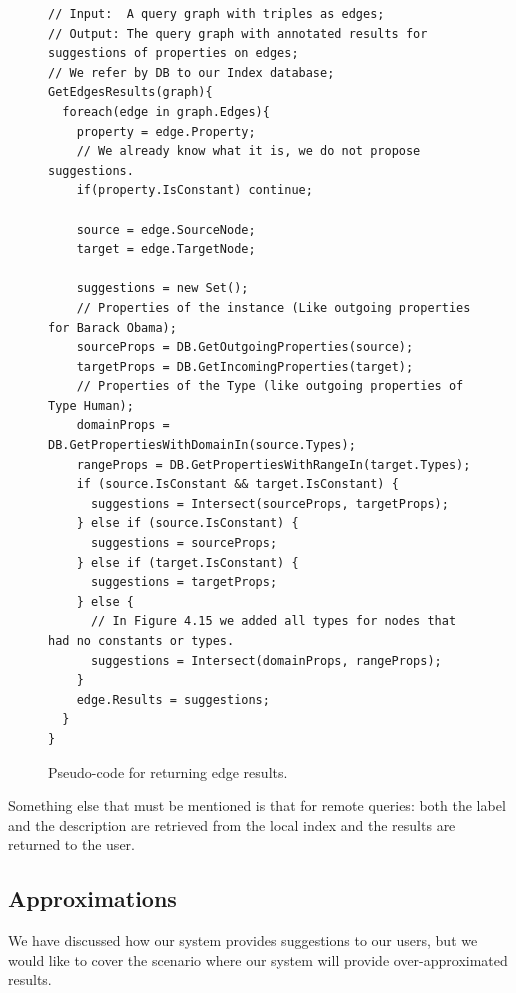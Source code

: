 \begin{example}
\begin{figure}[h]
\begin{verbatim}
// Input:  A query graph with triples as edges;
// Output: The query graph with annotated results for suggestions of properties on edges;
// We refer by DB to our Index database;
GetEdgesResults(graph){
  foreach(edge in graph.Edges){
    property = edge.Property;
    // We already know what it is, we do not propose suggestions.
    if(property.IsConstant) continue;
    
    source = edge.SourceNode;
    target = edge.TargetNode;

    suggestions = new Set();
    // Properties of the instance (Like outgoing properties for Barack Obama);
    sourceProps = DB.GetOutgoingProperties(source);
    targetProps = DB.GetIncomingProperties(target);
    // Properties of the Type (like outgoing properties of Type Human);
    domainProps = DB.GetPropertiesWithDomainIn(source.Types);
    rangeProps = DB.GetPropertiesWithRangeIn(target.Types);
    if (source.IsConstant && target.IsConstant) {
      suggestions = Intersect(sourceProps, targetProps);
    } else if (source.IsConstant) {
      suggestions = sourceProps;
    } else if (target.IsConstant) {
      suggestions = targetProps;
    } else {
      // In Figure 4.15 we added all types for nodes that had no constants or types.
      suggestions = Intersect(domainProps, rangeProps);
    }
    edge.Results = suggestions;
  }
}
\end{verbatim}
\caption{Pseudo-code for returning edge results.}
\label{fig:codeResultsEdges}
\end{figure}

\end{example}

Something else that must be mentioned is that for remote queries: both the label and the description are retrieved from the local index and the results are returned to the user. 


\subsection{Approximations}

We have discussed how our system provides suggestions to our users, but we would like to cover the scenario where our system will provide over-approximated results.

